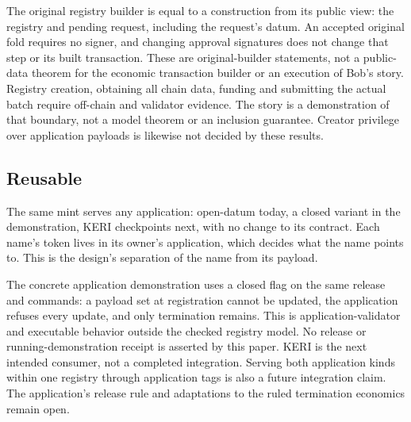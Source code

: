 \checked The original registry builder is equal to a construction from its
public view: the registry and pending request, including the request's datum.
An accepted original fold requires no signer, and changing approval signatures
does not change that step or its built transaction.
\missing These are original-builder statements, not a public-data theorem
for the economic transaction builder or an execution of Bob's story. Registry
creation, obtaining all chain data, funding and submitting the actual batch
require off-chain and validator evidence. The story is a demonstration of
that boundary, not a model theorem or an inclusion guarantee. Creator
privilege over application payloads is likewise not decided by these results.

\subsection{Reusable}
The same mint serves any application: open-datum today, a closed variant in
the demonstration, KERI checkpoints next, with no change to its contract.
Each name's token lives in its owner's application, which decides what the
name points to. This is the design's separation of the name from its payload.

\missing The concrete application demonstration uses a closed flag on the
same release and commands: a payload set at registration cannot be updated,
the application refuses every update, and only termination remains. This
is application-validator and executable behavior outside the checked registry
model. No release or running-demonstration receipt is asserted by this paper.
KERI is the next intended consumer, not a completed integration. Serving
both application kinds within one registry through application tags is also
a future integration claim. The application's release rule and adaptations
to the ruled termination economics remain open.
